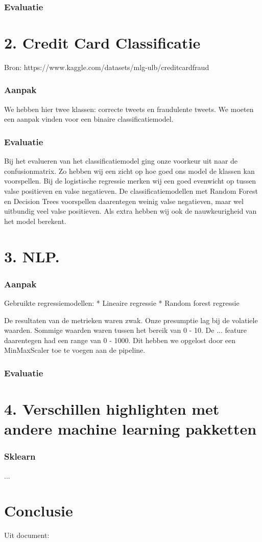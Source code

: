\documentclass[a4paper,12pt,twoside]{report}
\begin{document}
\subsection*{Evaluatie}

\chapter*{2. Credit Card Classificatie }

Bron: https://www.kaggle.com/datasets/mlg-ulb/creditcardfraud

\subsection*{Aanpak}
We hebben hier twee klassen: correcte tweets en fraudulente tweets. We moeten een aanpak vinden voor een binaire classificatiemodel.

\subsection*{Evaluatie}
Bij het evalueren van het classificatiemodel ging onze voorkeur uit naar de confusionmatrix. Zo hebben wij een zicht op hoe goed ons model de klassen kan voorspellen. Bij de logistische regressie merken wij een goed evenwicht op tussen valse positieven en valse negatieven. De classificatiemodellen met Random Forest en Decision Trees voorspellen daarentegen weinig valse negatieven, maar wel uitbundig veel valse positieven. Als extra hebben wij ook de nauwkeurigheid van het model berekent.

\chapter*{3. NLP.}

\subsection*{Aanpak}

Gebruikte regressiemodellen:
* Lineaire regressie
* Random forest regressie

De resultaten van de metrieken waren zwak. Onze presumptie lag bij de volatiele waarden. Sommige waarden waren tussen het bereik van 0 - 10. De ... feature daarentegen had een range van 0 - 1000. Dit hebben we opgelost door een MinMaxScaler toe te voegen aan de pipeline.

\subsection*{Evaluatie}

\chapter*{4. Verschillen highlighten met andere machine learning pakketten}

\subsection*{Sklearn}

...

\chapter*{Conclusie}

Uit document:



\appendix
\end{document}
